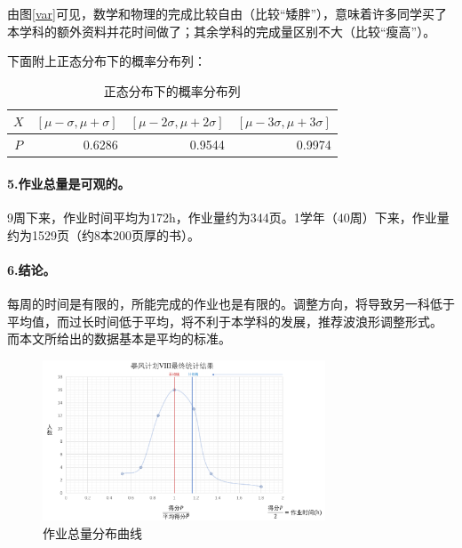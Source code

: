 \documentclass[a4paper,12pt]{article}
\begin{document}
\begin{CJK}{UTF8}{song}
由图\ref{var}可见，数学和物理的完成比较自由（比较“矮胖”），意味着许多同学买了本学科的额外资料并花时间做了；其余学科的完成量区别不大（比较“瘦高”）。

下面附上正态分布下的概率分布列：
\begin{table}[H]
    \centering
    \caption{正态分布下的概率分布列}
    \begin{tabular}{c|rrr}
        $X$ & $[\mu-\sigma,\mu+\sigma]$ & $[\mu-2\sigma,\mu+2\sigma]$ & $[\mu-3\sigma,\mu+3\sigma]$ \\
        \hline
        $P$ & 0.6286 & 0.9544 & 0.9974 \\
    \end{tabular}
\end{table}

\paragraph{5.作业总量是可观的。}
9周下来，作业时间平均为172h，作业量约为344页。1学年（40周）下来，作业量约为1529页（约8本200页厚的书）。

\paragraph{6.结论。} 每周的时间是有限的，所能完成的作业也是有限的。调整方向，将导致另一科低于平均值，而过长时间低于平均，将不利于本学科的发展，推荐波浪形调整形式。
而本文所给出的数据基本是平均的标准。 

\begin{figure}[H]
    \centering
    \includegraphics[width=0.75\textwidth]{img/6.png}
    \caption{作业总量分布曲线}
    \label{curve}
\end{figure}


\end{CJK}
\end{document}
